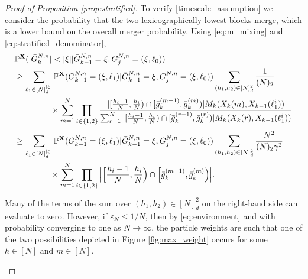 \documentclass[a4paper,11pt]{article}
\theoremstyle{definition}
\newcommand{\bbP}{\mathbb{P}}
\newcommand{\bfX}{\mathbf{X}}
\begin{document}
\begin{proof}[Proof of Proposition \ref{prop:stratified}]
To verify \eqref{timescale_assumption} we consider the probability that the two lexicographically lowest blocks merge, which is a lower bound on the overall merger probability.
Using \eqref{eq:m_mixing} and \eqref{eq:stratified_denominator},
\begin{align}
&\bbP^{ \bfX }( | \bar{ G }_k^{ N, n } | < | \xi | | \bar{ G }_{ k - 1 }^{ N, n } = \xi, G_j^{ N, n } = ( \xi, \ell_0 ) ) \notag \\
&\geq \sum_{ \ell_1 \in [ N ]_d^{ | \xi | } } \bbP^{ \bfX }( G_{ k - 1 }^{ N, n } = ( \xi, \ell_1 ) | \bar{ G }_{ k - 1 }^{ N, n } = \xi, G_j^{ N, n } = ( \xi, \ell_0 ) ) \sum_{ ( h_1, h_2 ) \in [ N ]_d^2 }  \frac{ 1 }{ ( N )_2 } \notag \\
&\phantom{= \sum_{ \ell_1 \in [ N ]_d^{ | \xi | } } } \times \sum_{ m = 1 }^N \prod_{ i \in \{ 1, 2 \} } \frac{ | [ \frac{ h_i - 1 }{ N }, \frac{ h_i }{ N } ) \cap [ \bar{ g }_k^{ ( m - 1 ) }, \bar{ g }_k^{ ( m ) } ) | M_k( X_k( m ), X_{ k - 1 }( \ell_1^i ) ) }{ \sum_{ r = 1 }^N | [ \frac{ h_i - 1 }{ N }, \frac{ h_i }{ N } ) \cap [ \bar{ g }_k^{ ( r - 1 ) }, \bar{ g }_k^{ ( r ) } ) | M_k( X_k( r ), X_{ k - 1 }( \ell_1^i ) ) } \notag \\
&\geq \sum_{ \ell_1 \in [ N ]_d^{ | \xi | } } \bbP^{ \bfX }( G_{ k - 1 }^{ N, n } = ( \xi, \ell_1 ) | \bar{ G }_{ k - 1 }^{ N, n } = \xi, G_j^{ N, n } = ( \xi, \ell_0 ) ) \sum_{ ( h_1, h_2 ) \in [ N ]_d^2 }  \frac{ N^2 }{ ( N )_2 \gamma^2 } \notag \\
&\phantom{= \sum_{ \ell_1 \in [ N ]_d^{ | \xi | } } } \times \sum_{ m = 1 }^N \prod_{ i \in \{ 1, 2 \} } \Big| \Big[ \frac{ h_i - 1 }{ N }, \frac{ h_i }{ N } \Big) \cap \Big[ \bar{ g }_k^{ ( m - 1 ) }, \bar{ g }_k^{ ( m ) } \Big) \Big|. \label{stratified_lb_start}
\end{align}
Many of the terms of the sum over $(h_1, h_2) \in [N]_d^2$ on the right-hand side can evaluate to zero.
However, if $\varepsilon_N \leq 1/N$, then by \eqref{eq:environment} and with probability converging to one as $N \to \infty$, the particle weights are such that one of the two possibilities depicted in Figure \ref{fig:max_weight} occurs for some $h \in [N]$ and $m \in [N]$.
\begin{figure}[!ht]
\centering
\end{figure}
\end{proof}
\end{document}
